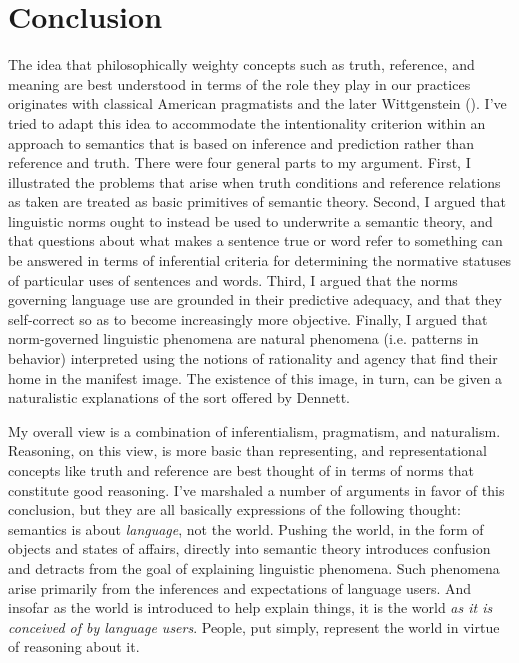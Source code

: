 \section{Conclusion}

The idea that philosophically weighty concepts such as truth, reference, and meaning are best understood in terms of the role they play in our practices originates with classical American pragmatists \citep{Misak:2013,Misak:2007,Peirce:1992} and the later Wittgenstein (\citeyear{Wittgenstein:1953}). I've tried to adapt this idea to accommodate the intentionality criterion within an approach to semantics that is based on inference and prediction rather than reference and truth. There were four general parts to my argument. First, I illustrated the problems that arise when truth conditions and reference relations as taken are treated as basic primitives of semantic theory. Second, I argued that linguistic norms ought to instead be used to underwrite a semantic theory, and that questions about what makes a sentence true or word refer to something can be answered in terms of inferential criteria for determining the normative statuses of particular uses of sentences and words. Third, I argued that the norms governing language use are grounded in their predictive adequacy, and that they self-correct so as to become increasingly more objective. Finally, I argued that norm-governed linguistic phenomena are natural phenomena (i.e. patterns in behavior) interpreted using the notions of rationality and agency that find their home in the manifest image. The existence of this image, in turn, can be given a naturalistic explanations of the sort offered by Dennett. 

My overall view is a combination of inferentialism, pragmatism, and naturalism. Reasoning, on this view, is more basic than representing, and representational concepts like truth and reference are best thought of in terms of norms that constitute good reasoning. I've marshaled a number of arguments in favor of this conclusion, but they are all basically expressions of the following thought: semantics is about \textit{language}, not the world. Pushing the world, in the form of objects and states of affairs, directly into semantic theory introduces confusion and detracts from the goal of explaining linguistic phenomena. Such phenomena arise primarily from the inferences and expectations of language users. And insofar as the world is introduced to help explain things, it is the world \textit{as it is conceived of by language users}. People, put simply, represent the world in virtue of reasoning about it.
